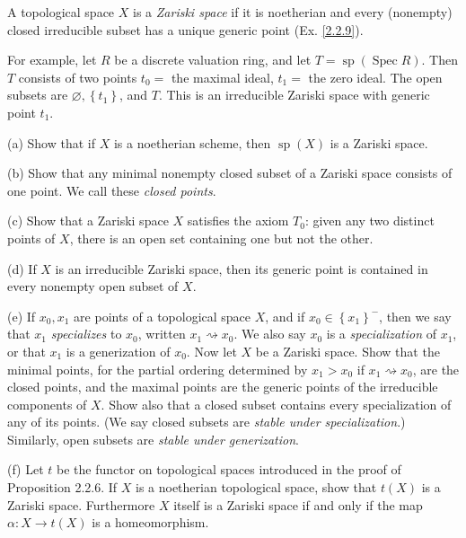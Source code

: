 \begin{exe}
	\label{2.3.17}
	A topological space $X$ is a \emph{Zariski space} if it is noetherian and every (nonempty) closed irreducible subset has a unique generic point (Ex. \ref{2.2.9}).
	
	For example, let $R$ be a discrete valuation ring, and let $T=\operatorname{sp}(\operatorname{Spec} R)$. Then $T$ consists of two points $t_{0}=$ the maximal ideal, $t_{1}=$ the zero ideal. The open subsets are $\varnothing,\left\{t_{1}\right\}$, and $T$. This is an irreducible Zariski space with generic point $t_{1}$.
	
	(a) Show that if $X$ is a noetherian scheme, then $\operatorname{sp}(X)$ is a Zariski space.
	
	(b) Show that any minimal nonempty closed subset of a Zariski space consists of one point. We call these \emph{closed points}.
	
	(c) Show that a Zariski space $X$ satisfies the axiom $T_{0}$: given any two distinct points of $X$, there is an open set containing one but not the other.
	
	(d) If $X$ is an irreducible Zariski space, then its generic point is contained in every nonempty open subset of $X$.
	
	(e) If $x_{0}, x_{1}$ are points of a topological space $X$, and if $x_{0} \in\left\{x_{1}\right\}^{-}$, then we say that $x_{1}$ \emph{specializes} to $x_{0}$, written $x_{1}\rightsquigarrow x_{0}$. We also say $x_{0}$ is a \emph{specialization} of $x_{1}$, or that $x_{1}$ is a generization of $x_{0}$. Now let $X$ be a Zariski space. Show that the minimal points, for the partial ordering determined by $x_{1}>x_{0}$ if $x_{1} \rightsquigarrow x_{0}$, are the closed points, and the maximal points are the generic points of the irreducible components of $X$. Show also that a closed subset contains every specialization of any of its points. (We say closed subsets are \emph{stable under specialization}.) Similarly, open subsets are \emph{stable under generization}.
	
	(f) Let $t$ be the functor on topological spaces introduced in the proof of Proposition 2.2.6. If $X$ is a noetherian topological space, show that $t(X)$ is a Zariski space. Furthermore $X$ itself is a Zariski space if and only if the map $\alpha: X \rightarrow t(X)$ is a homeomorphism.
\end{exe}
